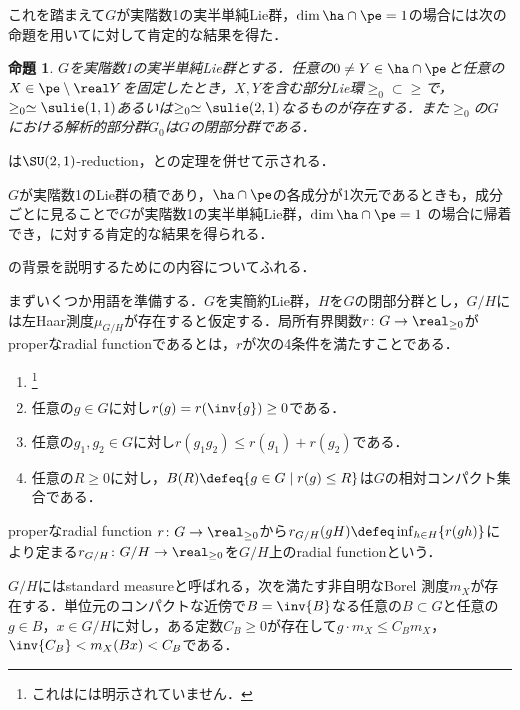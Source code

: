 \documentclass[12pt,dvipdfmx,uplatex]{jsarticle}
\newcounter{countabst}
\newtheorem{prop-a}[countabst]{命題}
\begin{document}
これを踏まえて$G$が実階数1の実半単純Lie群，$\dim \ha\cap\pe =1 $の場合には次の命題を用いてに対して肯定的な結果を得た．

\begin{prop-a}\label{prop:reduction}
  $G$を実階数1の実半単純Lie群とする．任意の$0\neq Y\in \ha\cap\pe $と任意の$X\in \pe\setminus \real Y$を固定したとき，$X,Y$を含む部分Lie環$\ge_0\subset \ge$で，$\ge_0\simeq \sulie(1,1) $あるいは$\ge_0\simeq \sulie(2,1)$なるものが存在する．また$\ge_0$の$G$における解析的部分群$G_0$は$G$の閉部分群である．
\end{prop-a}
\vspace{-0.5em}
は{$\SU(2,1) $-reduction}，\cite{hel01}と\cite{yos38}の定理を併せて示される．

$G$が実階数1のLie群の積であり，$\ha\cap \pe $の各成分が1次元であるときも，成分ごとに見ることで$G$が実階数1の実半単純Lie群，$\dim \ha\cap\pe =1 $
の場合に帰着でき，に対する肯定的な結果を得られる．

の背景を説明するために\cite{ber88}の内容についてふれる．

まずいくつか用語を準備する．$G$を実簡約Lie群，$H$を$G$の閉部分群とし，$G/H$には左Haar測度$\mu_{G/H} $が存在すると仮定する．局所有界関数$r\colon G\to \real_{\geq 0} $がproperなradial functionであるとは，$r$が次の4条件を満たすことである．
\vspace{-1em}
\begin{enumerate}
\item {}\footnote{これは\cite{ber88}には明示されていません．}
\item 任意の$g\in G$に対し$r(g) = r(\inv{g})\geq 0  $である．
\item 任意の$g_1,g_2\in G$に対し$r(g_1g_2)\leq r(g_1) + r(g_2)  $である．
\item 任意の$R\geq 0$に対し，$B(R)\defeq \{g\in G\mid r(g)\leq R \} $は$G$の相対コンパクト集合である．
\end{enumerate}
\vspace{-0.5em}
properなradial function $r\colon G\to \real_{\geq 0} $から$r_{G/H}(gH)\defeq \inf_{h\in H}\{r(gh) \}$により定まる${r_{G/H}\colon G/H\to \real_{\geq 0}}$を$G/H$上のradial functionという．

$G/H$にはstandard measureと呼ばれる，次を満たす非自明なBorel 測度$m_X $が存在する．単位元のコンパクトな近傍で$B = \inv{B} $なる任意の$B\subset G$と任意の$g\in B$，$x\in G/H$に対し，ある定数$C_B\geq 0 $が存在して$g\cdot m_X \leq C_B m_X$，$ \inv{C_B} < m_X(Bx) < C_{B}$である．
\end{document}
